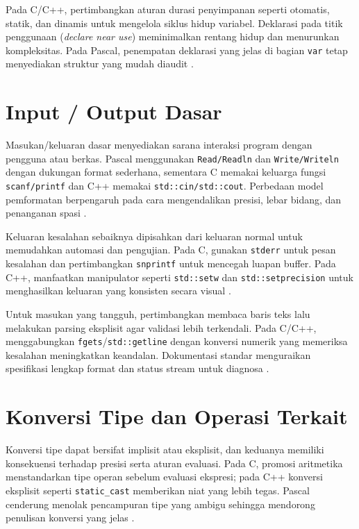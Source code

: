 \documentclass[../main.tex]{subfiles}
\begin{document}
Pada C/C++, pertimbangkan aturan durasi penyimpanan seperti otomatis, statik, dan dinamis untuk mengelola siklus hidup variabel. Deklarasi pada titik penggunaan (\emph{declare near use}) meminimalkan rentang hidup dan menurunkan kompleksitas. Pada Pascal, penempatan deklarasi yang jelas di bagian \texttt{var} tetap menyediakan struktur yang mudah diaudit \parencite{free-pascal-docs,gnu-c-manual}.

\section{Input / Output Dasar}
Masukan/keluaran dasar menyediakan sarana interaksi program dengan pengguna atau berkas. Pascal menggunakan \texttt{Read/Readln} dan \texttt{Write/Writeln} dengan dukungan format sederhana, sementara C memakai keluarga fungsi \texttt{scanf/printf} dan C++ memakai \texttt{std::cin/std::cout}. Perbedaan model pemformatan berpengaruh pada cara mengendalikan presisi, lebar bidang, dan penanganan spasi \parencite{w3pascal-io,gnu-c-manual,cplusplus-io}.

Keluaran kesalahan sebaiknya dipisahkan dari keluaran normal untuk memudahkan automasi dan pengujian. Pada C, gunakan \texttt{stderr} untuk pesan kesalahan dan pertimbangkan \texttt{snprintf} untuk mencegah luapan buffer. Pada C++, manfaatkan manipulator seperti \texttt{std::setw} dan \texttt{std::setprecision} untuk menghasilkan keluaran yang konsisten secara visual \parencite{gnu-c-manual,cpp-reference}.

Untuk masukan yang tangguh, pertimbangkan membaca baris teks lalu melakukan parsing eksplisit agar validasi lebih terkendali. Pada C/C++, menggabungkan \texttt{fgets}/\texttt{std::getline} dengan konversi numerik yang memeriksa kesalahan meningkatkan keandalan. Dokumentasi standar menguraikan spesifikasi lengkap format dan status stream untuk diagnosa \parencite{iso-c-draft-n1570,cpp-reference}.

\section{Konversi Tipe dan Operasi Terkait}
Konversi tipe dapat bersifat implisit atau eksplisit, dan keduanya memiliki konsekuensi terhadap presisi serta aturan evaluasi. Pada C, promosi aritmetika menstandarkan tipe operan sebelum evaluasi ekspresi; pada C++ konversi eksplisit seperti \texttt{static\_cast} memberikan niat yang lebih tegas. Pascal cenderung menolak pencampuran tipe yang ambigu sehingga mendorong penulisan konversi yang jelas \parencite{pascal-tutorial-wikibooks,gnu-c-manual,cpp-reference}.
\end{document}
